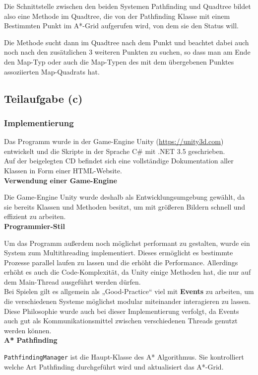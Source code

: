 \documentclass[a4paper,12pt]{article}
\newcommand{\code}{\texttt}
\begin{document}
Die Schnittstelle zwischen den beiden Systemen Pathfinding und Quadtree bildet also eine Methode im Quadtree, die von der Pathfinding Klasse mit einem Bestimmten Punkt im A*-Grid aufgerufen wird, von dem sie den Status will.

Die Methode sucht dann im Quadtree nach dem Punkt und beachtet dabei auch noch nach den zusätzlichen 3 weiteren Punkten zu suchen, so dass man am Ende den Map-Typ oder auch die Map-Typen des mit dem übergebenen Punktes assoziierten Map-Quadrats hat.

\subsection{Teilaufgabe (c)}
\subsubsection{Implementierung}
Das Programm wurde in der Game-Engine Unity (\url{https://unity3d.com}) entwickelt und die Skripte in der Sprache C\# mit .NET 3.5 geschrieben.
\\[0.4cm]
Auf der beigelegten CD befindet sich eine vollständige Dokumentation aller Klassen in Form einer HTML-Website.
\\[0.4cm]
\textbf{Verwendung einer Game-Engine}

Die Game-Engine Unity wurde deshalb als Entwicklungsumgebung gewählt, da sie bereits Klassen und Methoden besitzt, um mit größeren Bildern schnell und effizient zu arbeiten.
\\[0.4cm]
\textbf{Programmier-Stil}

Um das Programm außerdem noch möglichst performant zu gestalten, wurde ein System zum Multithreading \cite{csharp6} implementiert. Dieses ermöglicht es bestimmte Prozesse parallel laufen zu lassen und die erhöht die Performance. Allerdings erhöht es auch die Code-Komplexität, da Unity einige Methoden hat, die nur auf dem Main-Thread ausgeführt werden dürfen.
\\[0.4cm]
Bei Spielen gilt es allgemein als „Good-Practice“ viel mit \textbf{Events} \cite{csharp6} zu arbeiten, um die verschiedenen Systeme möglichst modular miteinander interagieren zu lassen. Diese Philosophie wurde auch bei dieser Implementierung verfolgt, da Events auch gut als Kommunikationsmittel zwischen verschiedenen Threads genutzt werden können.
\\[0.4cm]
\textbf{A* Pathfinding}

\code{PathfindingManager} ist die Haupt-Klasse des A* Algorithmus. Sie kontrolliert welche Art Pathfinding durchgeführt wird und aktualisiert das A*-Grid.
\end{document}
